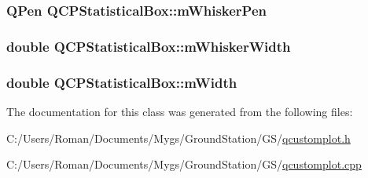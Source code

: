 \subsubsection[{m\+Whisker\+Pen}]{\setlength{\rightskip}{0pt plus 5cm}Q\+Pen Q\+C\+P\+Statistical\+Box\+::m\+Whisker\+Pen\hspace{0.3cm}{\ttfamily [protected]}}\label{class_q_c_p_statistical_box_a25b7552499f0f090fcff02858b2265a5}
\hypertarget{class_q_c_p_statistical_box_a4d166474f845d5db626e8b11a0815a6f}{}
\subsubsection[{m\+Whisker\+Width}]{\setlength{\rightskip}{0pt plus 5cm}double Q\+C\+P\+Statistical\+Box\+::m\+Whisker\+Width\hspace{0.3cm}{\ttfamily [protected]}}\label{class_q_c_p_statistical_box_a4d166474f845d5db626e8b11a0815a6f}
\hypertarget{class_q_c_p_statistical_box_af365e40b0f706c3d76f857c7957f629d}{}
\subsubsection[{m\+Width}]{\setlength{\rightskip}{0pt plus 5cm}double Q\+C\+P\+Statistical\+Box\+::m\+Width\hspace{0.3cm}{\ttfamily [protected]}}\label{class_q_c_p_statistical_box_af365e40b0f706c3d76f857c7957f629d}


The documentation for this class was generated from the following files\+:\begin{DoxyCompactItemize}
\item 
C\+:/\+Users/\+Roman/\+Documents/\+Mygs/\+Ground\+Station/\+G\+S/\hyperlink{qcustomplot_8h}{qcustomplot.\+h}\item 
C\+:/\+Users/\+Roman/\+Documents/\+Mygs/\+Ground\+Station/\+G\+S/\hyperlink{qcustomplot_8cpp}{qcustomplot.\+cpp}\end{DoxyCompactItemize}
